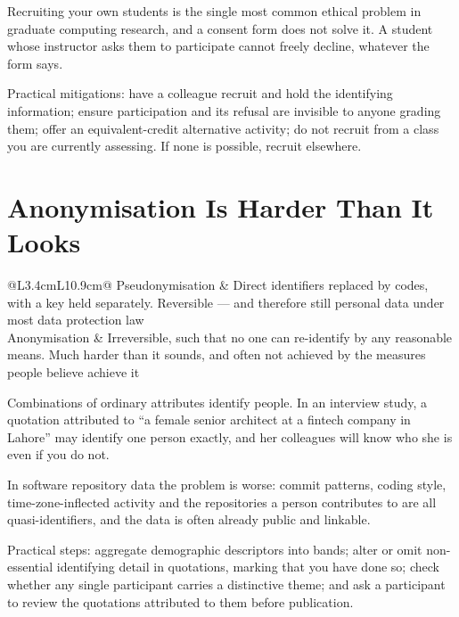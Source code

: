 \begin{alertbox}
Recruiting your own students is the single most common ethical problem in
graduate computing research, and a consent form does not solve it. A student
whose instructor asks them to participate cannot freely decline, whatever the
form says.

\medskip
Practical mitigations: have a colleague recruit and hold the identifying
information; ensure participation and its refusal are invisible to anyone
grading them; offer an equivalent-credit alternative activity; do not recruit
from a class you are currently assessing. If none is possible, recruit
elsewhere.
\end{alertbox}

\section{Anonymisation Is Harder Than It Looks}

\begin{center}
\small
\begin{tabular}{@{}L{3.4cm}L{10.9cm}@{}}
\toprule
Pseudonymisation & Direct identifiers replaced by codes, with a key held
                   separately. Reversible --- and therefore still personal data
                   under most data protection law \\
Anonymisation    & Irreversible, such that no one can re-identify by any
                   reasonable means. Much harder than it sounds, and often not
                   achieved by the measures people believe achieve it \\
\bottomrule
\end{tabular}
\end{center}

\begin{pitfall}
Combinations of ordinary attributes identify people. In an interview study, a
quotation attributed to ``a female senior architect at a fintech company in
Lahore'' may identify one person exactly, and her colleagues will know who she
is even if you do not.

\medskip
In software repository data the problem is worse: commit patterns, coding
style, time-zone-inflected activity and the repositories a person contributes to
are all quasi-identifiers, and the data is often already public and linkable.

\medskip
Practical steps: aggregate demographic descriptors into bands; alter or omit
non-essential identifying detail in quotations, marking that you have done so;
check whether any single participant carries a distinctive theme; and ask a
participant to review the quotations attributed to them before publication.
\end{pitfall}

